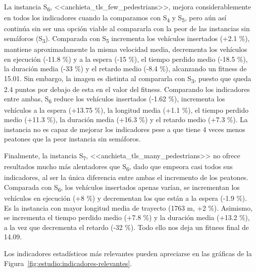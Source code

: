 La instancia S\textsubscript{6}, <<anchieta\_tls\_few\_pedestrians>>, mejora considerablemente en todos los indicadores cuando la comparamos con S\textsubscript{4} y S\textsubscript{5}, pero aún así continúa sin ser una opción viable al compararla con la peor de las instancias sin semáforos (S\textsubscript{3}). Comparada con S\textsubscript{5} incrementa los vehículos insertados (+2.1 \%), mantiene aproximadamente la misma velocidad media, decrementa los vehículos en ejecución (-11.8 \%) y a la espera (-15 \%), el tiempo perdido medio (-18.5 \%), la duración media (-33 \%) y el retardo medio (-8.4 \%), alcanzando un fitness de 15.01. Sin embargo, la imagen es distinta al compararla con S\textsubscript{3}, puesto que queda 2.4 puntos por debajo de esta en el valor del fitness. Comparando los indicadores entre ambas, S\textsubscript{6} reduce los vehículos insertados (-1.62 \%), incrementa los vehículos a la espera (+13.75 \%), la longitud media (+1.1 \%), el tiempo perdido medio (+11.3 \%), la duración media (+16.3 \%) y el retardo medio (+7.3 \%). La instancia no es capaz de mejorar los indicadores pese a que tiene 4 veces menos peatones que la peor instancia sin semáforos.

Finalmente, la instancia S\textsubscript{7}, <<anchieta\_tls\_many\_pedestrians>> no ofrece resultados mucho más alentadores que S\textsubscript{6}, dado que empeora casi todos sus indicadores, al ser la única diferencia entre ambas el incremento de los peatones. Comparada con S\textsubscript{6}, los vehículos insertados apenas varían, se incrementan los vehículos en ejecución (+8 \%) y decrementan los que están a la espera (-1.9 \%). Es la instancia con mayor longitud media de trayecto (1763 m, +2 \%). Asimismo, se incrementa el tiempo perdido medio (+7.8 \%) y la duración media (+13.2 \%), a la vez que decrementa el retardo (-32 \%). Todo ello nos deja un fitness final de 14.09.

Los indicadores estadísticos más relevantes pueden apreciarse en las gráficas de la Figura~\ref{fig:estudio:indicadores-relevantes}.

